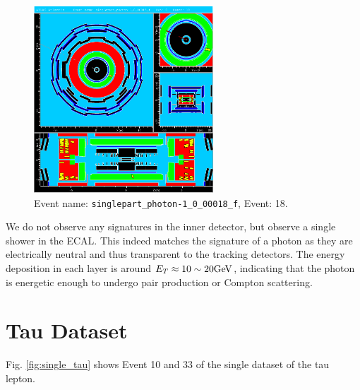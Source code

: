 \documentclass[a4paper]{report}
\numberwithin{equation}{section}
\begin{document}
\begin{figure}[htpb]
    \centering
    \includegraphics[width=0.6\textwidth]{photon_event18.eps}
    \caption{Event name: \texttt{singlepart\_photon-1\_0\_00018\_f}, Event: 18. }
    \label{fig:single_photon}
\end{figure}

We do not observe any signatures in the inner detector, but observe a single shower in the ECAL. This indeed matches the signature 
of a photon as they are electrically neutral and thus transparent to the tracking detectors. The energy deposition in each 
layer is around $E_T \approx 10 \sim 20 \si[]{\giga\electronvolt}$, indicating that the photon is energetic enough to undergo 
pair production or Compton scattering. \par 

\section{Tau Dataset}

Fig. \ref{fig:single_tau} shows Event 10 and 33 of the single dataset of the tau lepton. 
\end{document}
